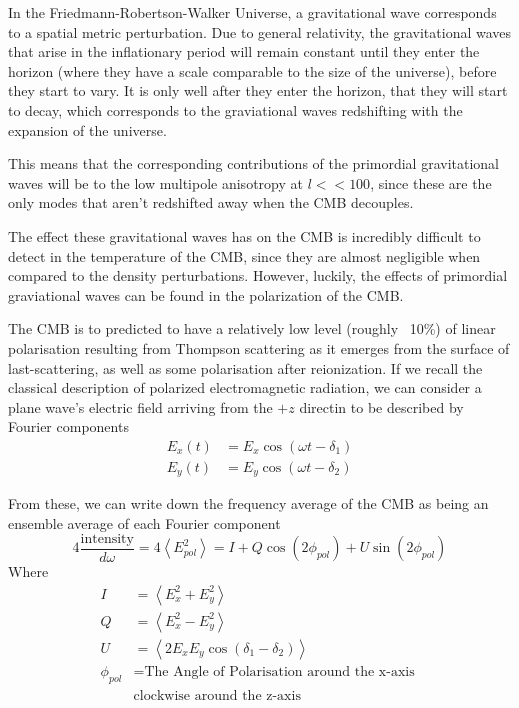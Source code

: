 {\par In the Friedmann-Robertson-Walker Universe, a gravitational wave corresponds to a spatial metric perturbation. Due to general relativity, the gravitational waves that arise in the inflationary period will remain constant until they enter the horizon (where they have a scale comparable to the size of the universe), before they start to vary. It is only well after they enter the horizon, that they will start to decay, which corresponds to the graviational waves redshifting with the expansion of the universe.

\par This means that the corresponding contributions of the primordial gravitational waves will be to the low multipole anisotropy at $l<<100$, since these are the only modes that aren't redshifted away when the CMB decouples.

\par The effect these gravitational waves has on the CMB is incredibly difficult to detect in the temperature of the CMB, since they are almost negligible when compared to the density perturbations. However, luckily, the effects of primordial graviational waves can be found in the polarization of the CMB.

\par The CMB is to predicted to have a relatively low level (roughly ~10\%) of linear polarisation resulting from Thompson scattering as it emerges from the surface of last-scattering, as well as some polarisation after reionization. If we recall the classical description of polarized electromagnetic radiation, we can consider a plane wave's electric field arriving from the $+z$ directin to be described by Fourier components
\begin{align*}
	E_x (t) & = E_x \cos(\omega t - \delta_1) \\
	E_y (t) & = E_y \cos(\omega t - \delta_2) 
\end{align*}

From these, we can write down the frequency average of the CMB as being an ensemble average of each Fourier component
$$ 4 \frac{\text{intensity}}{d \omega} = 4 \left< E_{pol}^2 \right> =  I + Q \cos(2 \phi_{pol}) + U \sin(2 \phi_{pol}) $$
Where
\begin{align*}
	I          & = \left< E_x^2 + E_y^2 \right>                        \\
	Q          & = \left< E_x^2 - E_y^2 \right>                        \\
	U          & = \left<2 E_x E_y \cos(\delta_1 - \delta_2) \right>   \\
	\phi_{pol} & = \text{The Angle of Polarisation around the x-axis } \\
	           & \text{clockwise around the z-axis}                    
\end{align*}

}
